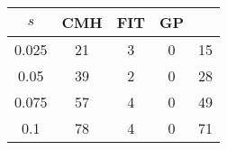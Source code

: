 \centering \begin{tabular}{c|c|c|c|c}
$s$	&CMH	&FIT	&GP	&\sc{Clear} \\\hline
0.025	&21	&3	&0	&15\\
0.05	&39	&2	&0	&28\\
0.075	&57	&4	&0	&49\\
0.1	&78	&4	&0	&71\\
\end{tabular}
